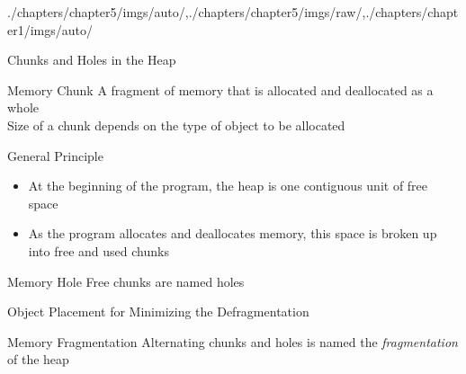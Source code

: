 \begin{graphicspathcontext}{{./chapters/chapter5/imgs/auto/},{./chapters/chapter5/imgs/raw/},{./chapters/chapter1/imgs/auto/}}
\begin{bibunit}[apalike]
\begin{frame}{{Chunks and Holes} in the Heap}
	\begin{definitionblock}{Memory Chunk}
		A fragment of memory that is allocated and deallocated as a whole \\[.2cm]
		Size of a chunk depends on the type of object to be allocated
	\end{definitionblock}
	\vspace{.2cm}
	\begin{block}{General Principle}
		\begin{itemize}
			\item At the beginning of the program, the heap is one contiguous unit of free space
			\item As the program allocates and deallocates memory, this space is broken up into free and used chunks
		\end{itemize}
	\end{block}
	\vspace{.2cm}
	\begin{definitionblock}{Memory Hole}
		Free chunks are named holes
	\end{definitionblock}
\end{frame}

\begin{frame}{Object Placement for Minimizing the Defragmentation}
	\begin{definitionblock}{Memory Fragmentation}
		Alternating chunks and holes is named the \emph{fragmentation} of the heap
	\end{definitionblock}
	\vspace{.2cm}
	\vspace{.2cm}
	\hfill
	\hfill
\end{frame}


\end{bibunit}
\end{graphicspathcontext}
